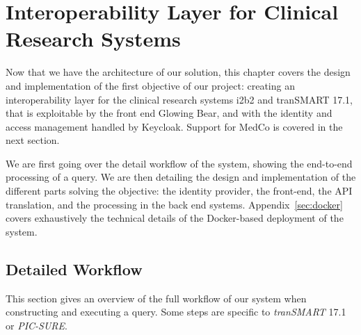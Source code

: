 
\chapter{Interoperability Layer for Clinical Research Systems}

Now that we have the architecture of our solution, this chapter covers the design and implementation of the first objective of our project: creating an interoperability layer for the clinical research systems i2b2 and tranSMART 17.1, that is exploitable by the front end Glowing Bear, and with the identity and access management handled by Keycloak.
Support for MedCo is covered in the next section.

We are first going over the detail workflow of the system, showing the end-to-end processing of a query.
We are then detailing the design and implementation of the different parts solving the objective: the identity provider, the front-end, the API translation, and the processing in the back end systems.
Appendix~\ref{sec:docker} covers exhaustively the technical details of the Docker-based deployment of the system.


\section{Detailed Workflow}
\label{sec:interoplayer-wf}

This section gives an overview of the full workflow of our system when constructing and executing a query.
Some steps are specific to \textit{tranSMART} 17.1 or \textit{PIC-SURE}.

